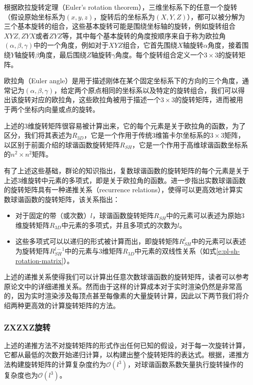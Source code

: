 根据欧拉旋转定理（Euler's rotation theorem），三维坐标系下的任意一个旋转（假设原始坐标系为$(x,y,z)$，旋转后的坐标系为$(X,Y,Z)$），都可以被分解为三个基本旋转的组合，这些基本旋转可能是围绕坐标轴的旋转，例如旋转组合$XYZ,ZYX$或者$ZYZ$等，其中每个基本旋转的角度按顺序来自于称为欧拉角$(\alpha,\beta,\gamma)$中的一个角度，例如对于$XYZ$组合，它首先围绕$X$轴旋转$\alpha$角度，接着围绕$Y$轴旋转$\beta$角度，最后围绕$Z$轴旋转$\gamma$角度。每个旋转组合定义一个$3\times 3$的旋转矩阵。

欧拉角（Euler angle）是用于描述刚体在某个固定坐标系下的方向的三个角度，通常记为$(\alpha,\beta,\gamma)$，给定两个原点相同的坐标系以及特定的旋转组合，我们可以得出该旋转对应的欧拉角，这些欧拉角被用于描述一个$3\times 3$的旋转矩阵，进而被用于两个坐标内向量或点的旋转。

上述的3维旋转矩阵很容易被计算出来，它的每个元素是关于欧拉角的函数，为了区分，我们将其表述为$R_{3D}$，它是一个作用于传统3维笛卡尔坐标系的$3\times 3$矩阵，以区别于前面介绍的球谐函数旋转矩阵$R_{SH}$，它是一个作用于高维球谐函数坐标系的$n^{2}\times n^{2}$矩阵。

有了上述这些基础，群论\cite{a:GruppentheorieundihreAnwendungaufdieQuantenmechanikderAtomspektren}的知识指出，复数球谐函数的旋转矩阵的每个元素是关于上述3维旋转中元素的多项式，即是关于欧拉角的函数。\cite{a:RotationMatricesforRealSphericalHarmonicsDirectDeterminationbyRecursion}进一步指出实数球谐函数的旋转矩阵具有一种递推关系（recurrence relations），使得可以更高效地计算实数球谐函数的旋转矩阵，该关系指出：

\begin{itemize}
	\item 对于固定的带（或次数）$l$，球谐函数旋转矩阵$R_{SH}$中的元素可以表述为原始3维旋转矩阵$R_{3D}$中元素的多项式，并且多项式的次数为$l$。
	\item 这些多项式可以以递归的形式被计算而出，即旋转矩阵$R^{l}_{SH}$中的元素可以表述为旋转矩阵$R^{l-1}_{SH}$中的元素与3维矩阵$R_{3D}$中元素的双线性关系（如式\ref{e:pl-sh-rotation-matrix}）。
\end{itemize}

上述的递推关系使得我们可以计算出任意次数球谐函数的旋转矩阵，读者可以参考原论文中的详细递推关系。然而由于这样的计算成本对于实时渲染仍然是非常高的，因为实时渲染涉及每顶点甚至每像素的大量旋转计算，因此以下两节我们将介绍两种更高效的计算旋转矩阵的方法。




\subsubsection{ZXZXZ旋转}
上述的递推方法不对旋转矩阵的形式作出任何已知的假设，对于每一次旋转计算，它都从最低的次数开始递归计算，以构建出整个旋转矩阵的表达式。根据\cite{a:FastApproximationtoSphericalHarmonicRotation}，递推方法构建旋转矩阵的计算复杂度约为$\mathcal{O}(l^{3})$，对球谐函数系数矢量执行旋转操作的复杂度也为$\mathcal{O}(l^{3})$。

